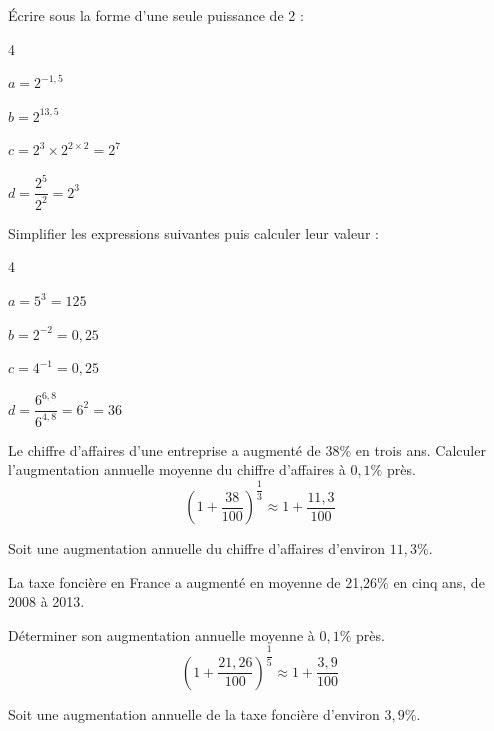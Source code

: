 \documentclass[french]{book}
\begin{document}
\begin{corrige}
Écrire sous la forme d'une seule puissance de 2 :
\begin{enumerate}
\begin{multicols}{4}
\item $a=2^{-1,5}$
\item $b=2^{13,5}$
\item $c=2^{3} \times 2^{2 \times 2}=2^7$
\item $d=\dfrac{2^{5}}{2^2}=2^3$ 
\end{multicols}
\end{enumerate}
\end{corrige}

\begin{corrige}

Simplifier les expressions suivantes puis calculer leur valeur :
\begin{enumerate}
\begin{multicols}{4}
\item $a=5^3=125$
\item $b=2^{-2}=0,25$
\item $c=4^{-1}=0,25$
\item $d=\dfrac{6^{6,8}}{6^{4,8}}=6^2=36$
\end{multicols}
\end{enumerate}
\end{corrige}

\begin{corrige}
Le chiffre d'affaires d'une entreprise a augmenté de $38 \%$ en trois ans.
Calculer l'augmentation annuelle moyenne du chiffre d'affaires à $0,1 \%$ près.\\

$$(1+\dfrac{38}{100})^{\dfrac{1}{3}}\approx 1+\dfrac{11,3}{100}$$

Soit une augmentation annuelle du chiffre d'affaires d'environ $11,3 \%$.

\end{corrige}



\begin{corrige}
La taxe foncière en France a augmenté en moyenne de 21,26\% en cinq ans, de 2008 à 2013.

Déterminer son augmentation annuelle moyenne à $0,1 \%$ près. \\

$$(1+\dfrac{21,26}{100})^{\dfrac{1}{5}}\approx 1+\dfrac{3,9}{100}$$

Soit une augmentation annuelle de la taxe foncière d'environ $3,9 \%$.
\end{corrige}
\end{document}

